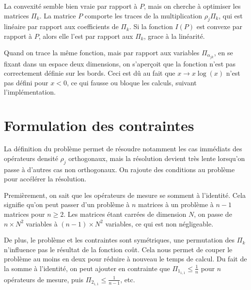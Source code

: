 La convexité semble bien vraie par rapport à $P$, mais on cherche à optimiser les matrices $\Pi_k$. La matrice $P$ comporte les traces de la multiplication $\rho_j \Pi_k$, qui est linéaire par rapport aux coefficients de $\Pi_k$. Si la fonction $I(P)$ est convexe par rapport à $P$, alors elle l'est par rapport aux $\Pi_k$, grace à la linéarité.

Quand on trace la même fonction, mais par rapport aux variables $\Pi_{\alpha_{jk}}$, en se fixant dans un espace deux dimensions, on s'aperçoit que la fonction n'est pas correctement définie sur les bords. Ceci est dû au fait que $x \longrightarrow x\log(x)$ n'est pas défini pour $x < 0$, ce qui fausse ou bloque les calculs, suivant l'implémentation.

\medbreak

\section{Formulation des contraintes}

La définition du problème permet de résoudre notamment les cas immédiats des opérateurs densité $\rho_j$ orthogonaux, mais la résolution devient très lente lorsqu'on passe à d'autres cas non orthogonaux. On rajoute des conditions au problème pour accélérer la résolution.


Premièrement, on sait que les opérateurs de mesure se somment à l'identité. Cela signifie qu'on peut passer d'un problème à $n$ matrices à un problème à $n-1$ matrices pour $n \geq 2$. Les matrices étant carrées de dimension $N$, on passe de $n \times N^2$ variables à $(n - 1) \times N^2$ variables, ce qui est non négligeable.

De plus, le problème et les contraintes sont symétriques, une permutation des $\Pi_k$ n'influence pas le résultat de la fonction coût. Cela nous permet de couper le problème au moins en deux pour réduire à nouveau le temps de calcul. Du fait de la somme à l'identité, on peut ajouter en contrainte que $\Pi_{1_{1, 1}} \leq \frac{1}{n}$ pour $n$ opérateurs de mesure, puis $\Pi_{2_{1, 1}} \leq \frac{1}{n-1}$, etc.

